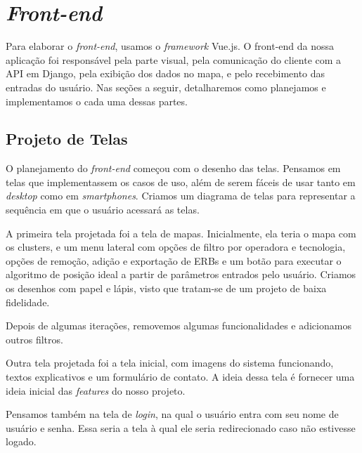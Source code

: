 \documentclass[]{politex}
\begin{document}
\section{\textit{Front-end}}
Para elaborar o \textit{front-end}, usamos o \textit{framework} Vue.js.
O front-end da nossa aplicação foi responsável pela parte visual, pela 
comunicação do cliente com a API em Django, pela exibição dos dados no mapa,
e pelo recebimento das entradas do usuário. Nas seções a seguir, detalharemos 
como planejamos e implementamos o cada uma dessas partes.

\subsection{Projeto de Telas}
O planejamento do \textit{front-end} começou com o desenho das telas. Pensamos em telas
que implementassem os casos de uso, além de serem fáceis de usar tanto em \textit{desktop}
como em \textit{smartphones}. Criamos um diagrama de telas para representar
a sequência em que o usuário acessará as telas.


A primeira tela projetada foi a tela de mapas. Inicialmente,
ela teria o mapa com os clusters, e um menu lateral com opções de filtro por 
operadora e tecnologia, opções de remoção, adição e exportação de ERBs e um 
botão para executar o algoritmo de posição ideal a partir de parâmetros entrados
pelo usuário. Criamos os desenhos com papel e lápis, visto que tratam-se de um
projeto de baixa fidelidade.


Depois de algumas iterações, removemos algumas funcionalidades e adicionamos 
outros filtros. 

Outra tela projetada foi a tela inicial, com imagens do sistema
funcionando, textos explicativos e um formulário de contato. A ideia dessa tela
é fornecer uma ideia inicial das \textit{features} do nosso projeto.


Pensamos também na tela de \textit{login}, na qual o usuário entra com seu nome de usuário e 
senha. Essa seria a tela à qual ele seria redirecionado caso não estivesse logado.

\end{document}
